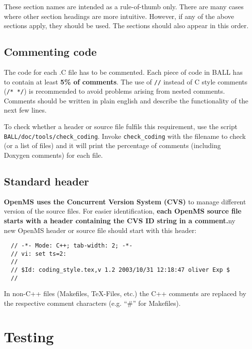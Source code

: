 \documentclass[a4]{article}
\begin{document}
These section names are intended as a rule-of-thumb only. There are many cases
where other section headings are more intuitive. However, if any of the above
sections apply, they should be used. The sections should also appear in this
order.

\subsection{Commenting code}

The code for each .C file has to be commented. Each piece of code in BALL has
to contain at least {\bf 5\% of comments}. The use of {\tt //} instead of C style
comments ({\tt /* */}) is recommended to avoid problems arising from nested
comments. Comments should be written in plain english and describe the
functionality of the next few lines.

To check whether a header or source file fulfils this requirement, use the
script {\tt BALL/doc/tools/check\_coding}. Invoke {\tt check\_coding} with the
filename to check (or a list of files) and it will print the percentage of
comments (including Doxygen comments) for each file.

\subsection{Standard header}
                                                                                                                                                             
{\bf OpenMS uses the Concurrent Version System (CVS)} to manage different
version of the
source files. For easier identification, {\bf each OpenMS source file starts
with a header containing the CVS ID string in a comment.}ny new OpenMS header
or source file
should start with this header:
\begin{verbatim}
  // -*- Mode: C++; tab-width: 2; -*-
  // vi: set ts=2:
  //
  // $Id: coding_style.tex,v 1.2 2003/10/31 12:18:47 oliver Exp $
  //                                                                                                                                                             
\end{verbatim}
In non-C++ files (Makefiles, TeX-Files, etc.) the C++ comments are replaced
by the respective comment characters (e.g. ``\#'' for Makefiles).
\section{Testing}
\end{document}
